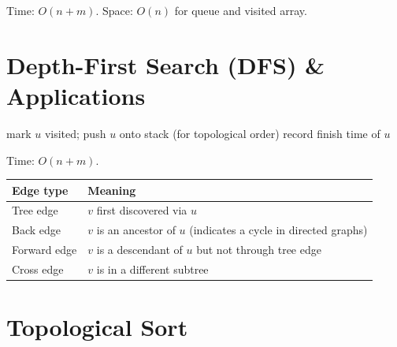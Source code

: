 \documentclass[oneside]{book}
\begin{document}
Time: $O(n + m)$. Space: $O(n)$ for queue and visited array.

\section{Depth-First Search (DFS) \& Applications}


\begin{algorithm}[H]
\caption{DFS}
\begin{algorithmic}[1]
    \State mark $u$ visited; push $u$ onto stack (for topological order)
            \State {}
        \EndIf
    \EndFor
    \State record finish time of $u$
\EndProcedure
\end{algorithmic}
\end{algorithm}

Time: $O(n + m)$.

\begin{center}
\begin{tabularx}{\linewidth}{lX}
\toprule
\textbf{Edge type} & \textbf{Meaning} \\
\midrule
Tree edge   & $v$ first discovered via $u$ \\
Back edge   & $v$ is an ancestor of $u$ (indicates a cycle in directed graphs) \\
Forward edge & $v$ is a descendant of $u$ but not through tree edge \\
Cross edge  & $v$ is in a different subtree \\
\bottomrule
\end{tabularx}
\end{center}

\section{Topological Sort}

\end{document}
